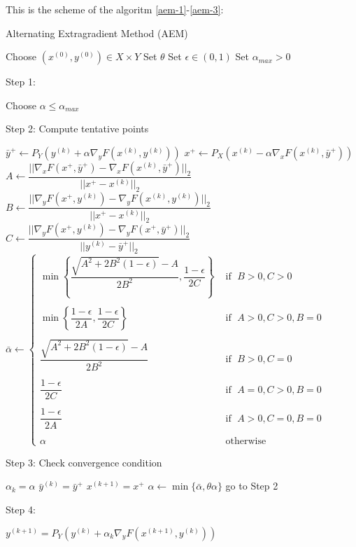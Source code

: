 This is the scheme of the algoritm \eqref{aem-1}-\eqref{aem-3}:

\begin{algorithm}[H]
\caption{Alternating Extragradient Method (AEM)}
\begin{algorithmic}
\STATE Choose $\left(x^{(0)},y^{(0)}\right) \in X \times Y$
\STATE Set $\theta$
\STATE Set $\epsilon \in (0,1)$
\STATE Set $\alpha_{max} > 0$
\STATE
\end{algorithmic}

Step 1:
\begin{algorithmic}
\STATE Choose $\alpha \leq \alpha_{max}$
\STATE
\end{algorithmic}

Step 2: Compute tentative points
\begin{algorithmic}
\STATE $ \bar{y}^+ \gets P_Y \left(y^{(k)} + \alpha \nabla_y F\left(x^{(k)},y^{(k)}\right)\right)$
\STATE
\STATE $ x^+ \gets P_X \left(x^{(k)} - \alpha \nabla_x F\left(x^{(k)},\bar{y}^+\right)\right)$
\STATE
\STATE $A \gets \dfrac{||\nabla_x F\left(x^+,\bar{y}^+\right) - \nabla_x F\left(x^{(k)},\bar{y}^+\right)||_2}{||x^+-x^{(k)}||_2} $
\STATE
\STATE $B \gets \dfrac{||\nabla_y F\left(x^+,y^{(k)}\right) - \nabla_y F\left(x^{(k)},y^{(k)}\right)||_2}{||x^+-x^{(k)}||_2} $
\STATE
\STATE $C \gets \dfrac{||\nabla_y F\left(x^+,y^{(k)}\right) - \nabla_y F\left(x^+,\bar{y}^+\right)||_2}{||y^{(k)}-\bar{y}^+||_2}$
\STATE
\STATE $\bar{\alpha} \gets \left\{ \begin{array}{ll}
\min \left\{\dfrac{\sqrt{A^2+2B^2(1-\epsilon)}-A}{2B^2}, \dfrac{1-\epsilon}{2C}\right\} & \mbox{ if }\; B>0, C>0 \\
\\
\min \left\{\dfrac{1-\epsilon}{2A},\dfrac{1-\epsilon}{2C}\right\} & \mbox{ if }\; A > 0 , C>0, B=0 \\
\\
\dfrac{\sqrt{A^2+2B^2(1-\epsilon)}-A}{2B^2} & \mbox{ if }\; B>0,C=0\\
\\
\dfrac{1-\epsilon}{2C} & \mbox{ if }\;A=0,C>0,B=0\\
\\
\dfrac{1-\epsilon}{2A} & \mbox{ if }\; A>0,C=0,B=0\\
\\
\alpha & \mbox{ otherwise}
\end{array} \right. $
\STATE
\end{algorithmic}

Step 3: Check convergence condition
\begin{algorithmic}
\IF{$\alpha \leq \bar{\alpha}$}
\STATE $\alpha_k = \alpha$
\STATE $\bar{y}^{(k)} = \bar{y}^+$
\STATE $x^{(k+1)} = x^+$
\ELSE
\STATE $\alpha \gets \min\{\bar{\alpha},\theta \alpha\}$
\STATE go to Step 2
\ENDIF
\end{algorithmic}

Step 4:
\begin{algorithmic}
\STATE $y^{(k+1)} = P_Y \left(y^{(k)} + \alpha_k \nabla_y F\left(x^{(k+1)},y^{(k)}\right)\right)$
\end{algorithmic}
\end{algorithm}



